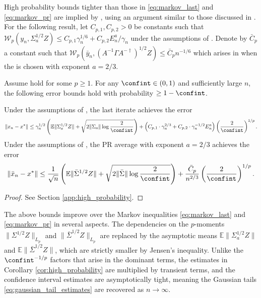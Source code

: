 \documentclass[11pt]{article}
\begin{document}
High probability bounds tighter than those in \eqref{eq:markov_last} and \eqref{eq:markov_pr} are implied by , using an argument similar to those discussed in \citep{fang2023moderatedeviations,liu2023wassersteinpboundscentrallimit}. 
For the following result, let $C_{p,1}, C_{p,2} > 0$ be constants such that $\mathcal{W}_p (y_n, \Sigma_a^{1/2} Z) \leq C_{p,1} \gamma_n^{1/6} + C_{p,2} E_n^a/\gamma_n$ under the assumptions of .
Denote by $\bar{C}_p$ a constant such that $\mathcal{W}_p (\bar{y}_n, (A^{-1} \Gamma A^{-\dagger})^{1/2}Z) \leq \bar{C}_p n^{-1/6}$  which arises in  when the \stepsize is chosen with exponent $a = 2/3$. 
\begin{corollary}\label{cor:high_probability}
    Assume  hold for some $p \geq 1$.
    For any $\confint \in (0, 1)$ and sufficiently large $n$, the following error bounds hold with probability $\geq 1 - \confint$.

    Under the assumptions of , the last iterate achieves the error 
    \begin{equation*}
        \lVert x_n - x^* \rVert 
        \leq 
        \gamma_n^{1/2}\left( \mathbb{E}\lVert \Sigma_a^{1/2} Z \rVert 
        + \sqrt{2  \lVert \Sigma_a \rVert \log \frac{2}{\confint}} \right) + \left(C_{p, 1} \cdot \gamma_n^{2/3} + C_{p, 2} \cdot \gamma_n^{-1/2} E_{n}^a\right) \left( \frac{2}{\confint} \right)^{1/p} .
    \end{equation*}
    Under the assumptions of , the PR average with \stepsize exponent $a = 2/3$ achieves the error
    \begin{equation*}
        \lVert \bar{x}_n - x^* \rVert 
        \leq 
    \frac{1}{\sqrt{n}} \left( 
    \mathbb{E}\lVert \bar{\Sigma}^{1/2}Z \rVert
    + \sqrt{2 \lVert \bar{\Sigma} \rVert \log \frac{2}{\confint}}
    \right)
    + 
    \frac{\bar{C}_{p}}{n^{2/3}} \left(\frac{2}{\confint} \right)^{1/p}
        .
    \end{equation*}
\end{corollary}
\begin{proof}
    See Section \ref{app:high_probability}.
\end{proof}
The above bounds improve over the Markov inequalities \eqref{eq:markov_last} and \eqref{eq:markov_pr} in several aspects. 
The dependencies on the $p$-moments $\lVert \Sigma^{1/2} Z \rVert_{L_p}$ and $\lVert \bar{\Sigma}^{1/2}Z \rVert_{L_p}$ are replaced by the asymptotic means $\mathbb{E}\lVert \Sigma_a^{1/2}Z \rVert$ and $\mathbb{E}\lVert \bar{\Sigma}^{1/2}Z\rVert$, which are strictly smaller by Jensen's inequality. 
Unlike the $\confint^{-1/p}$ factors that arise in the dominant terms, the estimates in Corollary \ref{cor:high_probability} are multiplied by transient terms, and the confidence interval estimates are asymptotically tight, meaning the Gaussian tails \eqref{eq:gaussian_tail_estimates} are recovered as $n \to \infty$. 
\end{document}
